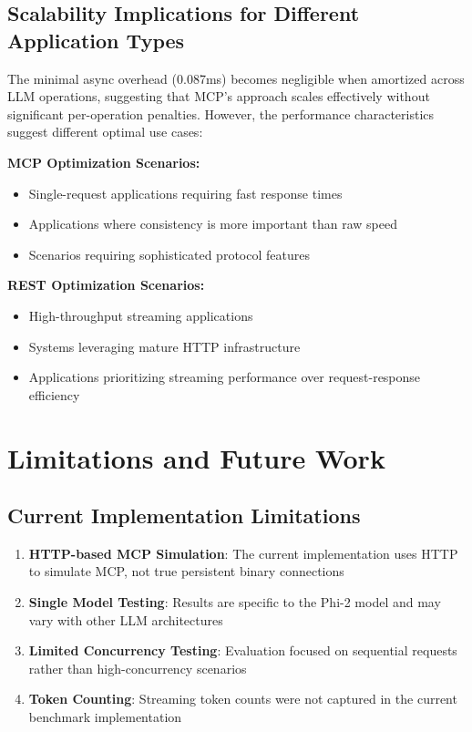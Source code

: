 \subsection{Scalability Implications for Different Application Types}

The minimal async overhead (0.087ms) becomes negligible when amortized across LLM operations, suggesting that MCP's approach scales effectively without significant per-operation penalties. However, the performance characteristics suggest different optimal use cases:

\textbf{MCP Optimization Scenarios:}
\begin{itemize}
    \item Single-request applications requiring fast response times
    \item Applications where consistency is more important than raw speed
    \item Scenarios requiring sophisticated protocol features
\end{itemize}

\textbf{REST Optimization Scenarios:}
\begin{itemize}
    \item High-throughput streaming applications
    \item Systems leveraging mature HTTP infrastructure
    \item Applications prioritizing streaming performance over request-response efficiency
\end{itemize}

\section{Limitations and Future Work}

\subsection{Current Implementation Limitations}

\begin{enumerate}
    \item \textbf{HTTP-based MCP Simulation}: The current implementation uses HTTP to simulate MCP, not true persistent binary connections
    \item \textbf{Single Model Testing}: Results are specific to the Phi-2 model and may vary with other LLM architectures
    \item \textbf{Limited Concurrency Testing}: Evaluation focused on sequential requests rather than high-concurrency scenarios
    \item \textbf{Token Counting}: Streaming token counts were not captured in the current benchmark implementation
\end{enumerate}

